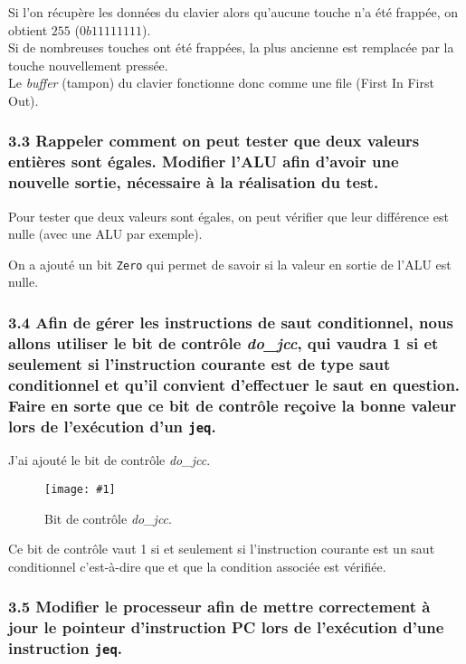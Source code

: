 \documentclass[twoside, 12pt, a4paper]{article}
\newcommand{\cf}[3]{
    \begin{figure}[!h]
        \centering
        \texttt{[image: \#1]}
    \caption{#3}\label{Fig:#1}
    \end{figure}
}
\newcommand{\hcf}[2]{\cf{#1}{.75}{#2}}
\begin{document}
Si l'on récupère les données du clavier alors qu'aucune touche n'a été frappée, on obtient $255$ ($0b11111111$). \\
Si de nombreuses touches ont été frappées, la plus ancienne est remplacée par la touche nouvellement pressée. \\
Le \textit{buffer} (tampon) du clavier fonctionne donc comme une file (First In First Out).

        \subsubsection*{\textbf{3.3} Rappeler comment on peut tester que deux valeurs entières sont égales. Modifier l'ALU afin d'avoir une nouvelle sortie, nécessaire à la réalisation du test.}

Pour tester que deux valeurs sont égales, on peut vérifier que leur différence est nulle (avec une ALU par exemple).

On a ajouté un bit \texttt{Zero} qui permet de savoir si la valeur en sortie de l'ALU est nulle.

        \subsubsection*{\textbf{3.4} Afin de gérer les instructions de saut conditionnel, nous allons utiliser le bit de contrôle \textit{do\_jcc}, qui vaudra 1 si et seulement si l'instruction courante est de type saut conditionnel et qu'il convient d'effectuer le saut en question. \\
        Faire en sorte que ce bit de contrôle reçoive la bonne valeur lors de l'exécution d'un \texttt{jeq}.}

J'ai ajouté le bit de contrôle \textit{do\_jcc}.

\hcf{do_jcc.png}{Bit de contrôle \textit{do\_jcc}.}

Ce bit de contrôle vaut 1 si et seulement si l'instruction courante est un saut conditionnel c'est-à-dire que  et que la condition associée est vérifiée.

\clearpage

        \subsubsection*{\textbf{3.5} Modifier le processeur afin de mettre correctement à jour le pointeur d'instruction PC lors de l'exécution d'une instruction \texttt{jeq}.}
\end{document}
